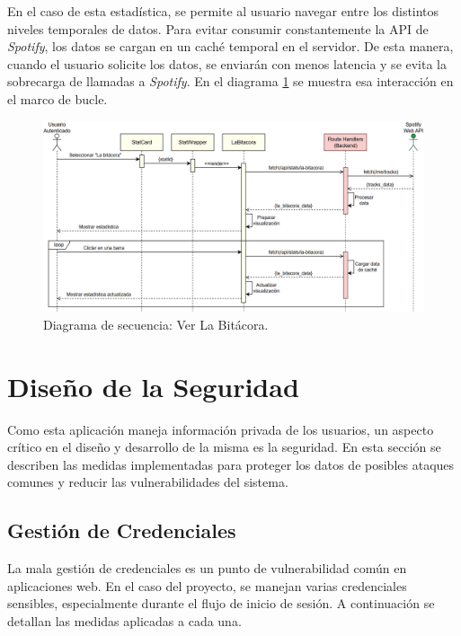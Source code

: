 En el caso de esta estadística, se permite al usuario navegar entre los distintos niveles temporales de datos. Para evitar consumir constantemente la API de \textit{Spotify}, los datos se cargan en un caché temporal en el servidor. De esta manera, cuando el usuario solicite los datos, se enviarán con menos latencia y se evita la sobrecarga de llamadas a \textit{Spotify}. En el diagrama \ref{fig:ds_ver_la_bitacora} se muestra esa interacción en el marco de bucle.

\begin{figure}[H]
    \centering
    \includegraphics[width=\textwidth]{figures/diagramas_secuencia/ds_ver_la_bitacora.png}
    \caption{Diagrama de secuencia: Ver La Bitácora.}
    \label{fig:ds_ver_la_bitacora}
\end{figure}

\section{Diseño de la Seguridad} \label{sec:diseno_seguridad}

Como esta aplicación maneja información privada de los usuarios, un aspecto crítico en el diseño y desarrollo de la misma es la seguridad. En esta sección se describen las medidas implementadas para proteger los datos de posibles ataques comunes y reducir las vulnerabilidades del sistema.

\subsection{Gestión de Credenciales}

La mala gestión de credenciales es un punto de vulnerabilidad común en aplicaciones web. En el caso del proyecto, se manejan varias credenciales sensibles, especialmente durante el flujo de inicio de sesión. A continuación se detallan las medidas aplicadas a cada una.

